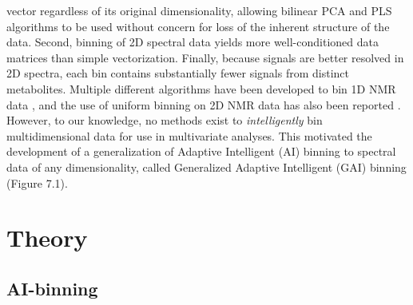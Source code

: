 \begin{doublespace}
vector regardless of its original dimensionality, allowing bilinear PCA and
PLS algorithms to be used without concern for loss of the inherent structure
of the data. Second, binning of 2D spectral data yields more well-conditioned
data matrices than simple vectorization. Finally, because signals are better
resolved in 2D spectra, each bin contains substantially fewer signals from
distinct metabolites. Multiple different algorithms have been developed to
bin 1D NMR data \cite{
  anderson:metab2008,
  anderson:metab2011,
  davis:cils2007,
  demeyer:anchem2008,
  sousa:cils2013}, and the use of uniform binning on 2D NMR data has also been
reported \cite{van:jpr2008}. However, to our knowledge, no methods
exist to {\it intelligently} bin multidimensional data for use in multivariate
analyses. This motivated the development of a generalization of Adaptive
Intelligent (AI) binning \cite{demeyer:anchem2008} to spectral data
of any dimensionality, called Generalized Adaptive Intelligent (GAI) binning
(Figure 7.1).
\end{doublespace}

\section{Theory}

\subsection{AI-binning}

